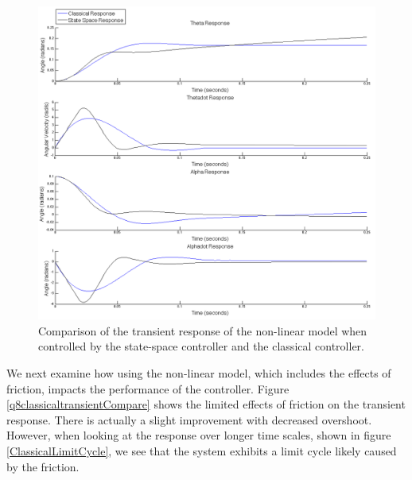 \documentclass{article}
\theoremstyle{plain}
\theoremstyle{definition}
\theoremstyle{remark}
\begin{document}
\begin{figure}
\begin{center}
\includegraphics[width = 15cm]{transientNonLinear}
\end{center}
\caption{Comparison of the transient response of the non-linear model when controlled by the state-space controller and the classical controller.}
\label{q8classicalvsStateSpace}
\end{figure}

We next examine how using the non-linear model, which includes the effects of friction, impacts the performance of the controller.  Figure \ref{q8classicaltransientCompare} shows the limited effects of friction on the transient response.  There is actually a slight improvement with decreased overshoot.  However, when looking at the response over longer time scales, shown in figure \ref{ClassicalLimitCycle}, we see that the system exhibits a limit cycle likely caused by the friction.  
\end{document}
